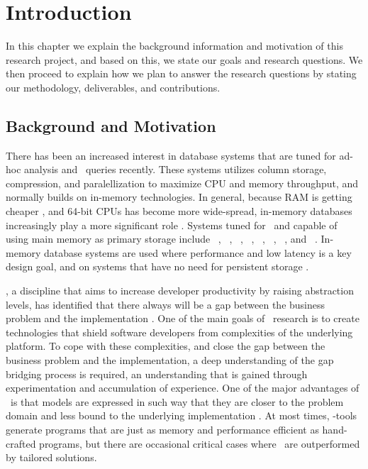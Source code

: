 \chapter{Introduction}
\label{chap:introduction}
In this chapter we explain the background information and motivation of this research project, and based on this, we state our goals and research questions. We then proceed to explain how we plan to answer the research questions by stating our methodology, deliverables, and contributions.
\clearpage

\section{Background and Motivation}
\label{sec:Background and Motivation}
There has been an increased interest in database systems that are tuned for ad-hoc analysis and \bi~queries recently. These systems utilizes column storage, compression, and paralellization to maximize CPU and memory throughput, and normally builds on in-memory technologies. In general, because RAM is getting cheaper \cite{Exasol2014-xh}, and 64-bit CPUs has become more wide-spread, in-memory databases increasingly play a more significant role \cite{Delaney2014-ip}. Systems tuned for \bi~and capable of using main memory as primary storage include \oracle~\cite{Lahiri2015-mz}, \saph~\cite{Farber2012-vh}, \gorilla~\cite{Pelkonen2015-ko}, \qlikview~\cite{Qlik2011-ef}, \tableau~\cite{Kamkolkar2015-iq}, \monetdb~\cite{Boncz2002-yj}, \blink~\cite{Barber2012-xt}, and \sapnw~\cite{Lemke2010-is}. In-memory database systems are used where performance and low latency is a key design goal, and on systems that have no need for persistent storage \cite{Zicari2012-is}. 

\mde, a discipline that aims to increase developer productivity by raising abstraction levels, has identified that there always will be a gap between the business problem and the implementation \cite{France2007-ae}. One of the main goals of \mdd~research is to create technologies that shield software developers from complexities of the underlying platform. To cope with these complexities, and close the gap between the business problem and the implementation, a deep understanding of the gap bridging process is required, an understanding that is gained through experimentation and accumulation of experience. One of the major advantages of \mde~is that models are expressed in such way that they are closer to the problem domain and less bound to the underlying implementation \cite{Selic2003-qa}. At most times, \mdd-tools generate programs that are just as memory and performance efficient as hand-crafted programs, but there are occasional critical cases where \mde~are outperformed by tailored solutions.

